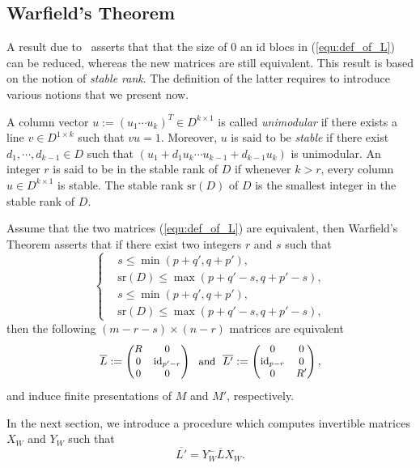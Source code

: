 \documentclass{ifacconf}
\newcommand\id[1]{\text{id}_{#1}}
\newcommand\sr{\text{sr}(D)}
\begin{document}
\subsection{Warfield's Theorem}

A result due to~\cite{Wa:78} asserts that that the size of $0$ an id
blocs in (\ref{equ:def_of_L}) can be reduced, whereas the new matrices
are still equivalent. This result is based on the notion of
\emph{stable rank}. The definition of the latter requires to introduce
various notions that we present now.

A column vector $u:=(u_1\cdots u_k)^T\in D^{k\times 1}$ is called
\emph{unimodular} if there exists a line $v\in D^{1\times k}$ such that
$vu=1$. Moreover, $u$ is said to be \emph{stable} if there exist 
$d_1,\cdots,d_{k-1}\in D$ such that
$(u_1+d_1u_k\cdots u_{k-1}+d_{k-1}u_k)$ is unimodular. An integer $r$ is
said to be in the stable rank of $D$ if whenever $k>r$, every column
$u\in D^{k\times 1}$ is stable. The stable rank $\sr$ of $D$ is the
smallest integer in the stable rank of $D$.

Assume that the two matrices (\ref{equ:def_of_L}) are equivalent, then
Warfield's Theorem asserts that if there exist two integers $r$ and $s$
such that
\smallskip
\begin{equation}\label{equ:s_r}
  \left\{
  \begin{split}
    & s\leq\min(p+q',q+p'),\\
    & \sr\leq\max(p+q'-s,q+p'-s),\\
    &s\leq\min(p+q',q+p'), \\
    & \sr\leq\max(p+q'-s,q+p'-s),
  \end{split}
  \right.
\end{equation}
then the following $(m-r-s)\times (n-r)$ matrices are equivalent
\begin{equation}\label{equ:def_of_L_bar}
  \begin{small}
    \overline{L}:=\begin{pmatrix}
    R & 0 \\
    0 & \id{p'-r} \\
    0 & 0
    \end{pmatrix}\ \ \text{and}\ \
    \overline{L'}:=\begin{pmatrix}
    0 & 0 \\
    \id{p-r} & 0 \\
    0 & R'
    \end{pmatrix},
  \end{small}
\end{equation}
and induce finite presentations of $M$ and $M'$, respectively.

In the next section, we introduce a procedure which computes invertible
matrices $X_W$ and $Y_W$ such that
\begin{equation}\label{equ:Warfield_equiv}
  \overline{L'}=Y_W^-\overline{L}X_W.
\end{equation}


\end{document}
